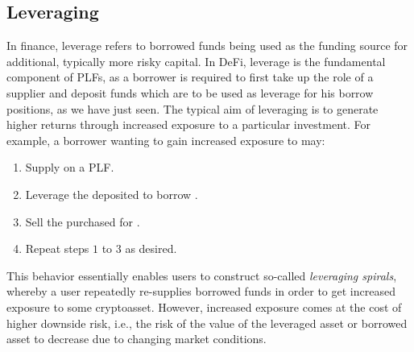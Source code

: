 \subsection{Leveraging}
In finance, leverage refers to borrowed funds being used as the funding source for additional, typically more risky capital.
In DeFi, leverage is the fundamental component of PLFs, as a borrower is required to first take up the role of a supplier and deposit funds which are to be used as leverage for his borrow positions, as we have just seen.
The typical aim of leveraging is to generate higher returns through increased exposure to a particular investment.
For example, a borrower wanting to gain increased exposure to  may:
\begin{enumerate}
\item Supply  on a PLF.
\item Leverage the deposited  to borrow .
\item Sell the purchased  for .
\item Repeat steps $1$ to $3$ as desired. 
\end{enumerate}

This behavior essentially enables users to construct so-called \textit{leveraging spirals}, whereby a user repeatedly re-supplies borrowed funds in order to get increased exposure to some cryptoasset. 
However, increased exposure comes at the cost of higher downside risk, i.e., the risk of the value of the leveraged asset or borrowed asset to decrease due to changing market conditions.

